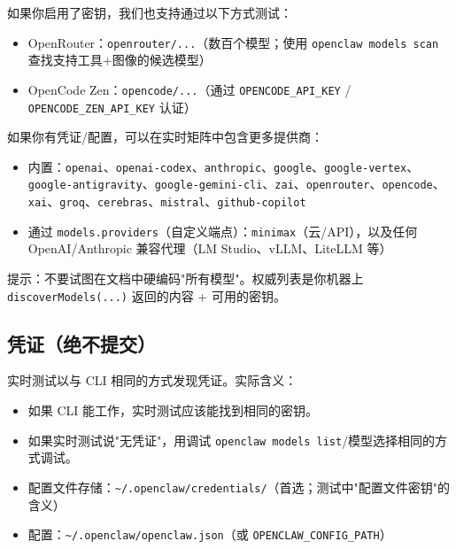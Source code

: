 如果你启用了密钥，我们也支持通过以下方式测试：

\begin{itemize}
  \item OpenRouter：\texttt{openrouter/...}（数百个模型；使用 \texttt{openclaw models scan} 查找支持工具+图像的候选模型）
  \item OpenCode Zen：\texttt{opencode/...}（通过 \texttt{OPENCODE\_API\_KEY} / \texttt{OPENCODE\_ZEN\_API\_KEY} 认证）
\end{itemize}


如果你有凭证/配置，可以在实时矩阵中包含更多提供商：

\begin{itemize}
  \item 内置：\texttt{openai}、\texttt{openai-codex}、\texttt{anthropic}、\texttt{google}、\texttt{google-vertex}、\texttt{google-antigravity}、\texttt{google-gemini-cli}、\texttt{zai}、\texttt{openrouter}、\texttt{opencode}、\texttt{xai}、\texttt{groq}、\texttt{cerebras}、\texttt{mistral}、\texttt{github-copilot}
  \item 通过 \texttt{models.providers}（自定义端点）：\texttt{minimax}（云/API），以及任何 OpenAI/Anthropic 兼容代理（LM Studio、vLLM、LiteLLM 等）
\end{itemize}


提示：不要试图在文档中硬编码"所有模型"。权威列表是你机器上 \texttt{discoverModels(...)} 返回的内容 + 可用的密钥。

\subsection{凭证（绝不提交）}


实时测试以与 CLI 相同的方式发现凭证。实际含义：

\begin{itemize}
  \item 如果 CLI 能工作，实时测试应该能找到相同的密钥。
  \item 如果实时测试说"无凭证"，用调试 \texttt{openclaw models list}/模型选择相同的方式调试。
\end{itemize}


\begin{itemize}
  \item 配置文件存储：\texttt{\textasciitilde{}/.openclaw/credentials/}（首选；测试中"配置文件密钥"的含义）
  \item 配置：\texttt{\textasciitilde{}/.openclaw/openclaw.json}（或 \texttt{OPENCLAW\_CONFIG\_PATH}）
\end{itemize}


